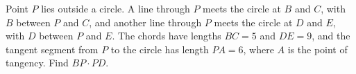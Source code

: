Point $P$ lies outside a circle. A line through $P$ meets the circle at $B$ and $C$, with $B$ between $P$ and $C$, and another line through $P$ meets the circle at $D$ and $E$, with $D$ between $P$ and $E$. The chords have lengths $BC=5$ and $DE=9$, and the tangent segment from $P$ to the circle has length $PA=6$, where $A$ is the point of tangency. Find $BP\cdot PD$.
